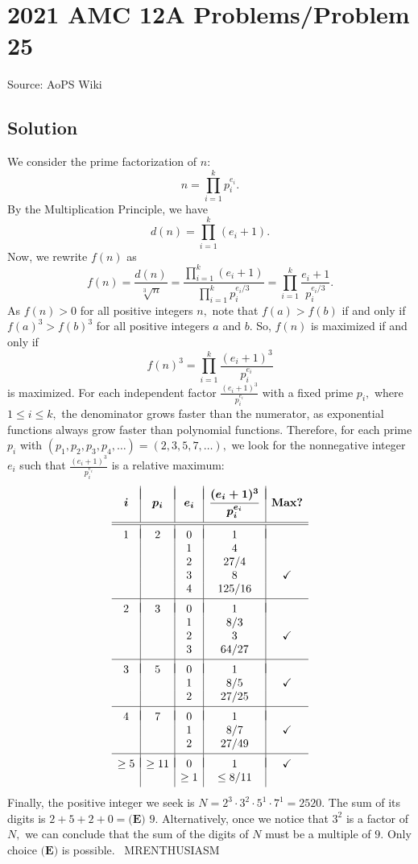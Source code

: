 \documentclass[12pt]{article}
\begin{document}
\section*{{2021 AMC 12A Problems/Problem 25}}
Source: AoPS Wiki

\subsection*{Solution}
We consider the prime factorization of $n:$ \[n=\prod_{i=1}^{k}p_i^{e_i}.\] By the Multiplication Principle, we have \[d(n)=\prod_{i=1}^{k}(e_i+1).\] Now, we rewrite $f(n)$ as \[f(n)=\frac{d(n)}{\sqrt [3]n}=\frac{\prod_{i=1}^{k}(e_i+1)}{\prod_{i=1}^{k}p_i^{e_i/3}}=\prod_{i=1}^{k}\frac{e_i+1}{p_i^{{e_i}/3}}.\] As $f(n)>0$ for all positive integers $n,$ note that $f(a)>f(b)$ if and only if $f(a)^3>f(b)^3$ for all positive integers $a$ and $b.$ So, $f(n)$ is maximized if and only if \[f(n)^3=\prod_{i=1}^{k}\frac{(e_i+1)^3}{p_i^{{e_i}}}\] is maximized. For each independent factor $\frac{(e_i+1)^3}{p_i^{e_i}}$ with a fixed prime $p_i,$ where $1\leq i\leq k,$ the denominator grows faster than the numerator, as exponential functions always grow faster than polynomial functions. Therefore, for each prime $p_i$ with $\left(p_1,p_2,p_3,p_4,\ldots\right)=\left(2,3,5,7,\ldots\right),$ we look for the nonnegative integer $e_i$ such that $\frac{(e_i+1)^3}{p_i^{e_i}}$ is a relative maximum: \[\begin{array}{c|c|c|c|c} & & & & \\ [-2.25ex] \boldsymbol{i} & \boldsymbol{p_i} & \boldsymbol{e_i} & \boldsymbol{\dfrac{(e_i+1)^3}{p_i^{e_i}}} & \textbf{Max?} \\ [2.5ex] \hline\hline & & & & \\ [-2ex] 1 & 2 & 0 & 1 & \\ & & 1 & 4 & \\ & & 2 & 27/4 &\\ & & 3 & 8 & \checkmark\\ & & 4 & 125/16 & \\ [0.5ex] \hline & & & & \\ [-2ex] 2 & 3 & 0 & 1 &\\ & & 1 & 8/3 & \\ & & 2 & 3 & \checkmark\\ & & 3 & 64/27 & \\ [0.5ex] \hline & & & & \\ [-2ex] 3 & 5 & 0 & 1 & \\ & & 1 & 8/5 & \checkmark\\ & & 2 & 27/25 & \\ [0.5ex] \hline & & & & \\ [-2ex] 4 & 7 & 0 & 1 & \\ & & 1 & 8/7 & \checkmark\\ & & 2 & 27/49 & \\ [0.5ex] \hline & & & & \\ [-2ex] \geq5 & \geq11 & 0 & 1 & \checkmark \\ & & \geq1 & \leq8/11 & \\ [0.5ex] \end{array}\] Finally, the positive integer we seek is $N=2^3\cdot3^2\cdot5^1\cdot7^1=2520.$ The sum of its digits is $2+5+2+0=\boxed{\textbf{(E) }9}.$ Alternatively, once we notice that $3^2$ is a factor of $N,$ we can conclude that the sum of the digits of $N$ must be a multiple of $9.$ Only choice $\textbf{(E)}$ is possible. ~MRENTHUSIASM
\end{document}
